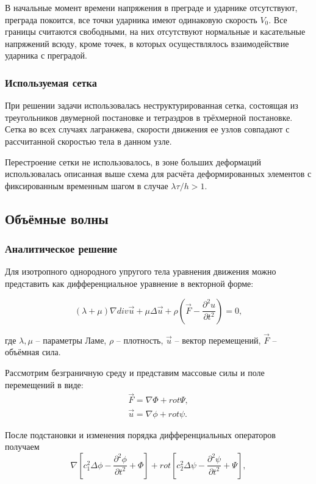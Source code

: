 В начальные момент времени напряжения в преграде и ударнике отсутствуют, преграда покоится, все точки ударника имеют одинаковую скорость $V_0$. Все границы считаются свободными, на них отсутствуют нормальные и касательные напряжений всюду, кроме точек, в которых осуществлялось взаимодействие ударника с преградой.

\subsubsection*{Используемая сетка}

При решении задачи использовалась неструктурированная сетка, состоящая из треугольников двумерной постановке и тетраэдров в трёхмерной постановке. Сетка во всех случаях лагранжева, скорости движения ее узлов совпадают с рассчитанной скоростью тела в данном узле.

Перестроение сетки не использовалось, в зоне больших деформаций использовалась описанная выше схема для расчёта деформированных элементов с фиксированным временным шагом в случае $\lambda \tau / h > 1$.


\subsection{Объёмные волны}

\subsubsection{Аналитическое решение}

Для изотропного однородного упругого тела уравнения движения можно представить как дифференциальное уравнение в векторной форме:

\begin{equation}
(\lambda+\mu)\nabla{div\vec{u}} + \mu\Delta\vec{u} + \rho(\vec{F}-\frac{\partial^2 u}{\partial t^2}) = 0,
\end{equation}

где $\lambda, \mu$ -- параметры Ламе, $\rho$ -- плотность, $\vec{u}$ -- вектор перемещений, $\vec{F}$ -- объёмная сила.

Рассмотрим безграничную среду и представим массовые силы и поле перемещений в виде:
\begin{eqnarray}
\vec{F} = \nabla\Phi + rot\Psi, \nonumber\\
\vec{u} = \nabla\phi + rot\psi.
\end{eqnarray}

После подстановки и изменения порядка дифференциальных операторов получаем
\begin{equation}
\nabla[c_1^2\Delta\phi - \frac{\partial^2 \phi}{\partial t^2} + \Phi] + rot[c_2^2\Delta\psi - \frac{\partial^2 \psi}{\partial t^2} + \Psi],
\end{equation}

